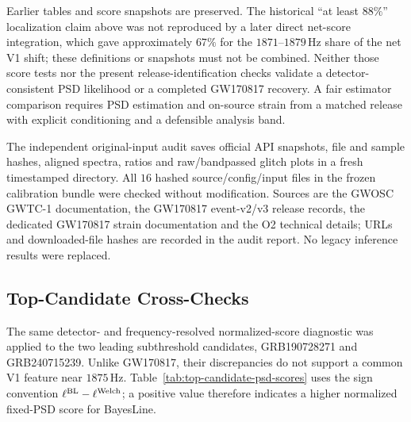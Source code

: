 Earlier tables and score snapshots are preserved. The historical
``at least $88\%$'' localization claim above was not reproduced by a
later direct net-score integration, which gave approximately $67\%$
for the $1871$--$1879\,\mathrm{Hz}$ share of the net V1 shift; these
definitions or snapshots must not be combined. Neither those score tests
nor the present release-identification checks validate a detector-consistent
PSD likelihood or a completed GW170817 recovery. A fair estimator
comparison requires PSD estimation and on-source strain from a matched
release with explicit conditioning and a defensible analysis band.

The independent original-input audit saves official API snapshots,
file and sample hashes, aligned spectra, ratios and raw/bandpassed glitch
plots in a fresh timestamped directory. All $16$ hashed source/config/input
files in the frozen calibration bundle were checked without modification.
Sources are the GWOSC GWTC-1 documentation, the GW170817 event-v2/v3
release records, the dedicated GW170817 strain documentation and the O2
technical details; URLs and downloaded-file hashes are recorded in the
audit report. No legacy inference results were replaced.

\subsection{Top-Candidate Cross-Checks}

The same detector- and frequency-resolved normalized-score diagnostic was
applied to the two leading subthreshold candidates, GRB190728271 and
GRB240715239. Unlike GW170817, their discrepancies do not support a common
V1 feature near $1875\,\mathrm{Hz}$. Table~\ref{tab:top-candidate-psd-scores}
uses the sign convention $\ell^{\rm BL}-\ell^{\rm Welch}$; a positive value
therefore indicates a higher normalized fixed-PSD score for BayesLine.

